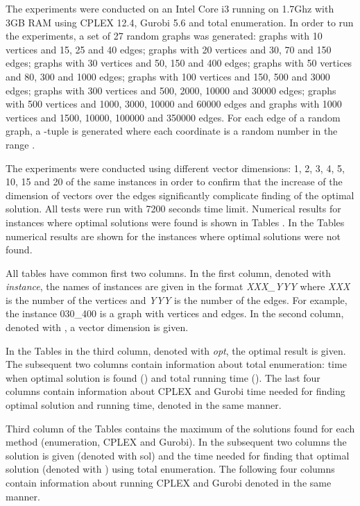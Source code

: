\documentclass[10pt]{article}
\begin{document}
The experiments were conducted on an Intel Core i3 running on 1.7Ghz with 3GB RAM using CPLEX 12.4, Gurobi 5.6 and total enumeration. In order to run the experiments, a set of 27 random graphs was generated: graphs with 10 vertices and 15, 25 and 40 edges; graphs with 20 vertices and 30, 70 and 150 edges; graphs with 30 vertices and 50, 150 and 400 edges; graphs with 50 vertices and 80, 300 and 1000 edges; graphs with 100 vertices and 150, 500 and 3000 edges; graphs with 300 vertices and 500, 2000, 10000 and 30000 edges; graphs with 500 vertices and 1000, 3000, 10000 and 60000 edges and graphs with 1000 vertices and 1500, 10000, 100000 and 350000 edges.
For each edge of a random graph, a -tuple is generated where each coordinate is a random number in the range .  

The experiments were conducted using different vector dimensions: 1, 2, 3, 4, 5, 10, 15 and 20 of the same instances in order to confirm that the increase of the dimension of vectors over the edges  significantly complicate finding of the optimal solution. All tests were run with 7200 seconds time limit. Numerical results for instances where optimal solutions were found is shown in Tables . In the Tables  numerical results are shown for the instances where optimal solutions were not found. 

All tables have common first two columns. In the first column, denoted with {\em instance}, the names of instances are given in the format {\em XXX\_YYY} where {\em XXX} is the number of the vertices and {\em YYY} is the number of the edges. For example, the instance 030\_400 is a graph with  vertices  and  edges. In the second column, denoted with , a vector dimension is given.  

In the Tables  in the third column, denoted with {\em opt}, the optimal result is given. The subsequent two columns contain information about total enumeration: time when optimal solution is found () and total running time (). The last four columns contain information about CPLEX and Gurobi time needed for finding optimal solution and running time, denoted in the same manner. 

Third column of the Tables  contains the maximum of the solutions found for each method (enumeration, CPLEX and Gurobi).  In the subsequent two columns the solution is given (denoted with sol) and the time needed for finding  that optimal solution (denoted with ) using total enumeration. The following four columns contain information about running CPLEX and Gurobi denoted in the same manner. 
\end{document}
